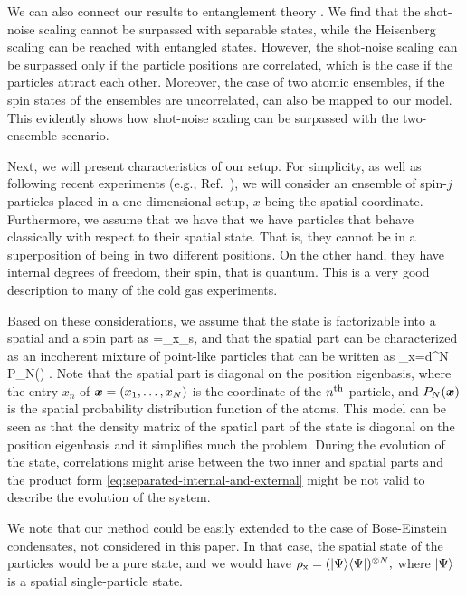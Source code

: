 We can also connect our results to entanglement theory \citep{Werner1989,Horodecki2009,Guehne2009}.
We find that the shot-noise scaling cannot be surpassed with separable states, while the Heisenberg scaling can be reached with entangled states.
However, the shot-noise scaling can be surpassed only if the particle positions are correlated, which is the case if the particles attract each other.
Moreover, the case of two atomic ensembles, if the spin states of the ensembles are uncorrelated, can also be mapped to our model.
This evidently shows how shot-noise scaling can be surpassed with the two-ensemble scenario.

Next, we will present characteristics of our setup.
For simplicity, as well as following  recent experiments (e.g., Ref.~\citep{Koschorreck2011}), we will consider an ensemble of spin-$j$ particles placed in a one-dimensional setup, $x$ being the spatial coordinate.
Furthermore, we assume that we have that we have particles that behave classically with respect to their spatial state.
That is, they cannot be in a superposition of being in two different positions.
On the other hand, they have internal degrees of freedom, their spin, that is quantum. This is a very good description to many of the cold gas experiments.

Based on these considerations, we assume that the state is factorizable into a spatial and a spin part as
\be
\label{eq:separated-internal-and-external}
\rho=\rho_{{\rm x}}\otimes\rho_{{\rm s}},
\ee
and that the spatial part can be characterized as an incoherent mixture of point-like particles that can be written as
\be
  \label{eq:thermal-state}
  \rho_{\rm x}=\int d^N\, P_N() .
\ee
Note that the spatial part is diagonal on the position eigenbasis, where the entry $x_n$ of $\boldsymbol{x} =(x_1,\dots,x_N)$ is the coordinate of the $n^{\rm th}$ particle, and $P_N(\boldsymbol{x})$ is the spatial probability distribution function of the atoms.
This model can be seen as that the density matrix of the spatial part of the state is diagonal on the position eigenbasis and it simplifies much the problem.
During the evolution of the state, correlations might arise between the two inner and spatial parts and the product form \eqref{eq:separated-internal-and-external} might be not valid to describe the evolution of the system.

We note that our method could be easily extended to the case of Bose-Einstein condensates, not considered in this paper. In that case, the spatial state of the particles would be a pure state, and we would have $\rho_{\rm x}=(\vert\Psi\rangle\langle\Psi\vert )^{\otimes N},$ where $\vert \Psi \rangle$ is a spatial single-particle state.

